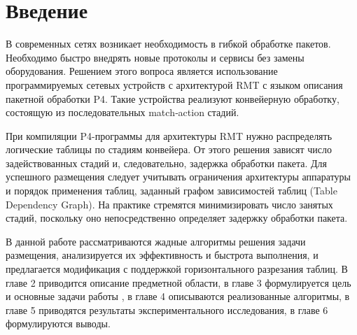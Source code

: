 \section{Введение}
\label{sec:Chapter0} 

В современных сетях возникает необходимость в гибкой обработке пакетов. Необходимо быстро внедрять новые протоколы и сервисы без замены оборудования. Решением этого вопроса является использование программируемых сетевых устройств с архитектурой RMT с языком описания пакетной обработки P4. Такие устройства реализуют конвейерную обработку, состоящую из последовательных match‑action стадий.

При компиляции P4-программы для архитектуры RMT нужно распределять логические таблицы по стадиям конвейера. От этого решения зависят число задействованных стадий и, следовательно, задержка обработки пакета. Для успешного размещения следует учитывать ограничения архитектуры аппаратуры и порядок применения таблиц, заданный графом зависимостей таблиц (Table Dependency Graph). На практике стремятся минимизировать число занятых стадий, поскольку оно непосредственно определяет задержку обработки пакета.

В данной работе рассматриваются жадные алгоритмы решения задачи размещения, анализируется их эффективность и быстрота выполнения, и предлагается модификация с поддержкой горизонтального разрезания таблиц. В главе 2 приводится описание предметной области, в главе 3 формулируется цель и основные задачи работы , в главе 4 описываются реализованные алгоритмы, в главе 5 приводятся результаты экспериментального исследования, в главе 6 формулируются выводы.



